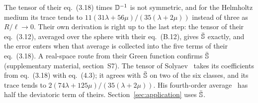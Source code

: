 The tensor of their eq.~(3.18) times $\mathbb{D}^{-1}$ is not symmetric, and
for the Helmholtz medium its trace tends to $11(31\lambda+56\mu)/(35(\lambda+2\mu))$ instead of
three as $R/\ell\to0$. Their own derivation is right up to the last step: the tensor of their
eq.~(3.12), averaged over the sphere with their eq.~(B.12), gives $\bar{\mathbb{S}}$ exactly, and the error
enters when that average is collected into the five terms of their eq.~(3.18). A real-space
route from their Green function confirms $\bar{\mathbb{S}}$ (supplementary material, section~S7). The
tensor of Solyaev~\cite[eq.~(21)]{Solyaev2023} takes its coefficients from eq.~(3.18) with
eq.~(4.3); it agrees with $\bar{\mathbb{S}}$ on two of the six classes, and its trace tends to
$2(74\lambda+125\mu)/(35(\lambda+2\mu))$. His fourth-order average~\cite[eq.~(20)]{Solyaev2023}
has half the deviatoric term of theirs. Section~\ref{sec:application} uses $\bar{\mathbb{S}}$.
